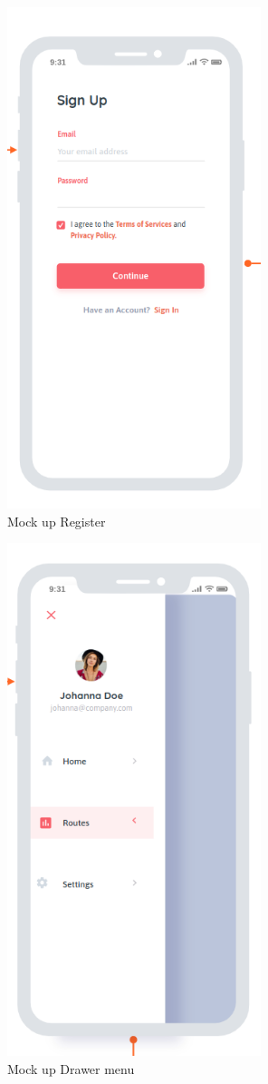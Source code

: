     \begin{figure}[htbp]
        \includegraphics[width=20em]{./graphics/register_Mockup.png}
        \centering
        \caption{Mock up Register}
        \label{fig:registerMockup}
    \end{figure}
    
    \begin{figure}[htbp]
        \includegraphics[width=20em]{./graphics/drawer_Mockup.png}
        \centering
        \caption{Mock up Drawer menu}
        \label{fig:DrawerMockup}
    \end{figure}

